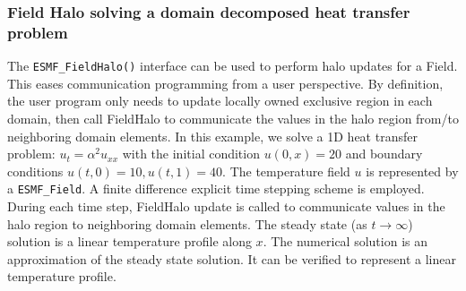  
\setlength{\oldparskip}{\parskip}
\setlength{\parskip}{1.5ex}
\setlength{\oldparindent}{\parindent}
\setlength{\parindent}{0pt}
\setlength{\oldbaselineskip}{\baselineskip}
\setlength{\baselineskip}{11pt}
 
\def\bv{\begin{verbatim}}
\def\ev{\end{verbatim}}
\def\be{\begin{equation}}
\def\ee{\end{equation}}
\def\bea{\begin{eqnarray}}
\def\eea{\end{eqnarray}}
\def\bi{\begin{itemize}}
\def\ei{\end{itemize}}
\def\bn{\begin{enumerate}}
\def\en{\end{enumerate}}
\def\bd{\begin{description}}
\def\ed{\end{description}}
\def\({\left (}
\def\){\right )}
\def\[{\left [}
\def\]{\right ]}
\def\<{\left  \langle}
\def\>{\right \rangle}
\def\cI{{\cal I}}
\def\diag{\mathop{\rm diag}}
\def\tr{\mathop{\rm tr}}


 

   \subsubsection{Field Halo solving a domain decomposed heat transfer problem}
   \label{sec:field:usage:halo}
  
   The {\tt ESMF\_FieldHalo()} interface can be used to perform halo updates for a Field. This
   eases communication programming from a user perspective. By definition, the user
   program only needs to update locally owned exclusive region in each domain, then call
   FieldHalo to communicate the values in the halo region from/to neighboring domain elements.
   In this example, we solve a 1D heat transfer problem: $u_t = \alpha^2 u_{xx}$ with the
   initial condition $u(0, x) = 20$ and boundary conditions $u(t, 0) = 10, u(t, 1) = 40$.
   The temperature field $u$
   is represented by a {\tt ESMF\_Field}. A finite difference explicit time stepping scheme is employed.
   During each time step, FieldHalo update is called to communicate values in the halo region
   to neighboring domain elements. The steady state (as $t \rightarrow \infty$) solution
   is a linear temperature profile along $x$. The numerical solution is an approximation of
   the steady state solution. It can be verified to represent a linear temperature profile.
  
